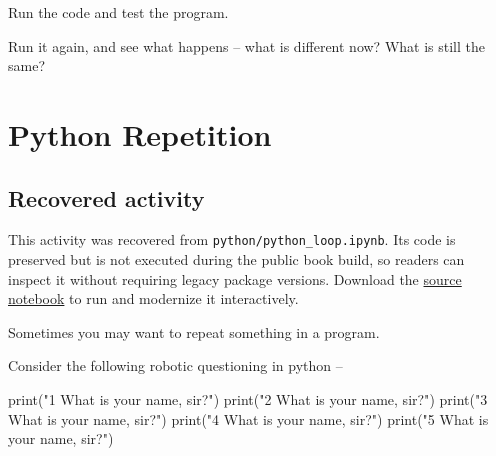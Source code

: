 \documentclass[
  letterpaper,
]{scrbook}
\newenvironment{Shaded}{\begin{snugshade}}{\end{snugshade}}
\newcommand{\BuiltInTok}[1]{\textcolor[rgb]{0.00,0.23,0.31}{#1}}
\newcommand{\NormalTok}[1]{\textcolor[rgb]{0.00,0.23,0.31}{#1}}
\newcommand{\StringTok}[1]{\textcolor[rgb]{0.13,0.47,0.30}{#1}}
\begin{document}
Run the code and test the program.

Run it again, and see what happens -- what is different now? What is
still the same?

\chapter*{Python Repetition}\label{ch-lab-python-loops}


\section*{Recovered activity}\label{sec-lab-python-loops}


\begin{tcolorbox}[enhanced jigsaw, arc=.35mm, bottomrule=.15mm, bottomtitle=1mm, breakable, colback=white, colbacktitle=quarto-callout-note-color!10!white, colframe=quarto-callout-note-color-frame, coltitle=black, left=2mm, leftrule=.75mm, opacityback=0, opacitybacktitle=0.6, rightrule=.15mm, title=\textcolor{quarto-callout-note-color}{\faInfo}\hspace{0.5em}{Historical source and execution note}, titlerule=0mm, toprule=.15mm, toptitle=1mm]

This activity was recovered from \texttt{python/python\_loop.ipynb}. Its
code is preserved but is not executed during the public book build, so
readers can inspect it without requiring legacy package versions.
Download the \href{../notebooks/python-loops.ipynb}{source notebook} to
run and modernize it interactively.

\end{tcolorbox}

Sometimes you may want to repeat something in a program.

Consider the following robotic questioning in python --

\begin{Shaded}
\begin{Highlighting}[]
\BuiltInTok{print}\NormalTok{(}\StringTok{"1 What is your name, sir?"}\NormalTok{)}
\BuiltInTok{print}\NormalTok{(}\StringTok{"2 What is your name, sir?"}\NormalTok{)}
\BuiltInTok{print}\NormalTok{(}\StringTok{"3 What is your name, sir?"}\NormalTok{)}
\BuiltInTok{print}\NormalTok{(}\StringTok{"4 What is your name, sir?"}\NormalTok{)}
\BuiltInTok{print}\NormalTok{(}\StringTok{"5 What is your name, sir?"}\NormalTok{)}
\end{Highlighting}
\end{Shaded}
\end{document}
